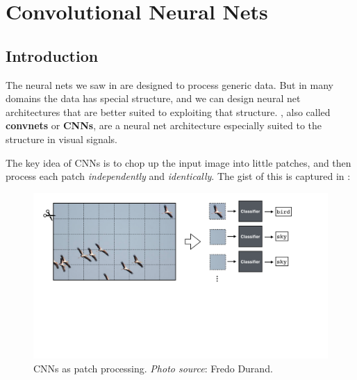 \chapter{Convolutional Neural Nets}
\label{chapter:convolutional_neural_nets}

\section{Introduction}

The neural nets we saw in \chap{\ref{chapter:neural_nets}} are designed to process generic data. But in many domains the data has special structure, and we can design neural net architectures that are better suited to exploiting that structure. , also called {\bf convnets} or {\bf CNNs}, are a neural net architecture especially suited to the structure in visual signals.



The key idea of CNNs is to chop up the input image into little patches, and then process each patch \textit{independently} and \textit{identically}. The gist of this is captured in \fig{\ref{fig:convolutional_neural_nets:CNNs_as_patch_processing}}:
\vspace{-0.2cm}
\begin{figure}[h]
    \centerline{
        \includegraphics[width=0.95\linewidth]{./figures/convolutional_neural_nets/CNNs_as_patch_processing.pdf}}
    \caption{CNNs as patch processing. {\em Photo source}: Fredo Durand.}
    \label{fig:convolutional_neural_nets:CNNs_as_patch_processing}
\end{figure}
\vspace{-0.2cm}

